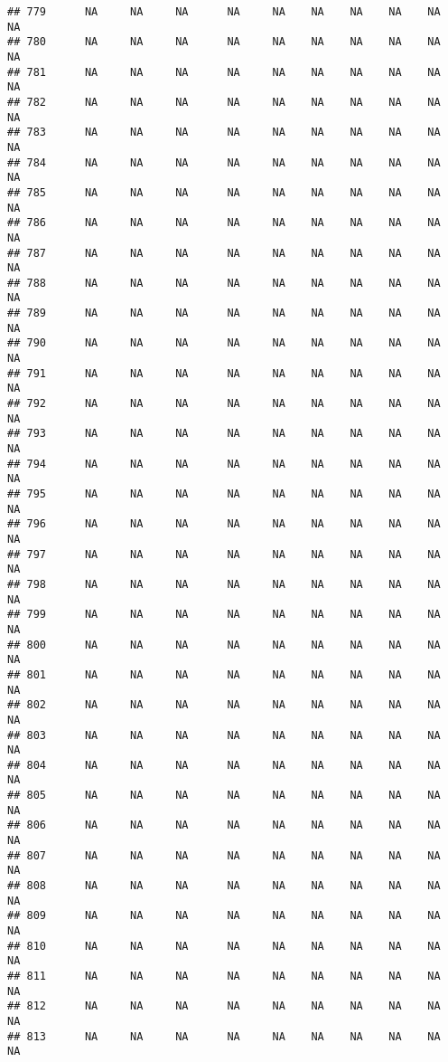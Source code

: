 \documentclass{article}\usepackage{graphicx, color}
\makeatletter
\newenvironment{kframe}{%
 \def\at@end@of@kframe{}%
 \ifinner\ifhmode%
  \def\at@end@of@kframe{\end{minipage}}%
  \begin{minipage}{\columnwidth}%
 \fi\fi%
 \def\FrameCommand##1{\hskip\@totalleftmargin \hskip-\fboxsep
 \colorbox{shadecolor}{##1}\hskip-\fboxsep
     \hskip-\linewidth \hskip-\@totalleftmargin \hskip\columnwidth}%
 \MakeFramed {\advance\hsize-\width
   \@totalleftmargin\z@ \linewidth\hsize
   \@setminipage}}%
 {\par\unskip\endMakeFramed%
 \at@end@of@kframe}
\newenvironment{knitrout}{}{} %
\makeatother
\begin{document}
\begin{knitrout}
\begin{kframe}
\begin{verbatim}
## 779      NA     NA     NA      NA     NA    NA    NA    NA    NA     NA
## 780      NA     NA     NA      NA     NA    NA    NA    NA    NA     NA
## 781      NA     NA     NA      NA     NA    NA    NA    NA    NA     NA
## 782      NA     NA     NA      NA     NA    NA    NA    NA    NA     NA
## 783      NA     NA     NA      NA     NA    NA    NA    NA    NA     NA
## 784      NA     NA     NA      NA     NA    NA    NA    NA    NA     NA
## 785      NA     NA     NA      NA     NA    NA    NA    NA    NA     NA
## 786      NA     NA     NA      NA     NA    NA    NA    NA    NA     NA
## 787      NA     NA     NA      NA     NA    NA    NA    NA    NA     NA
## 788      NA     NA     NA      NA     NA    NA    NA    NA    NA     NA
## 789      NA     NA     NA      NA     NA    NA    NA    NA    NA     NA
## 790      NA     NA     NA      NA     NA    NA    NA    NA    NA     NA
## 791      NA     NA     NA      NA     NA    NA    NA    NA    NA     NA
## 792      NA     NA     NA      NA     NA    NA    NA    NA    NA     NA
## 793      NA     NA     NA      NA     NA    NA    NA    NA    NA     NA
## 794      NA     NA     NA      NA     NA    NA    NA    NA    NA     NA
## 795      NA     NA     NA      NA     NA    NA    NA    NA    NA     NA
## 796      NA     NA     NA      NA     NA    NA    NA    NA    NA     NA
## 797      NA     NA     NA      NA     NA    NA    NA    NA    NA     NA
## 798      NA     NA     NA      NA     NA    NA    NA    NA    NA     NA
## 799      NA     NA     NA      NA     NA    NA    NA    NA    NA     NA
## 800      NA     NA     NA      NA     NA    NA    NA    NA    NA     NA
## 801      NA     NA     NA      NA     NA    NA    NA    NA    NA     NA
## 802      NA     NA     NA      NA     NA    NA    NA    NA    NA     NA
## 803      NA     NA     NA      NA     NA    NA    NA    NA    NA     NA
## 804      NA     NA     NA      NA     NA    NA    NA    NA    NA     NA
## 805      NA     NA     NA      NA     NA    NA    NA    NA    NA     NA
## 806      NA     NA     NA      NA     NA    NA    NA    NA    NA     NA
## 807      NA     NA     NA      NA     NA    NA    NA    NA    NA     NA
## 808      NA     NA     NA      NA     NA    NA    NA    NA    NA     NA
## 809      NA     NA     NA      NA     NA    NA    NA    NA    NA     NA
## 810      NA     NA     NA      NA     NA    NA    NA    NA    NA     NA
## 811      NA     NA     NA      NA     NA    NA    NA    NA    NA     NA
## 812      NA     NA     NA      NA     NA    NA    NA    NA    NA     NA
## 813      NA     NA     NA      NA     NA    NA    NA    NA    NA     NA

\end{verbatim}
\end{kframe}
\end{knitrout}
\end{document}
